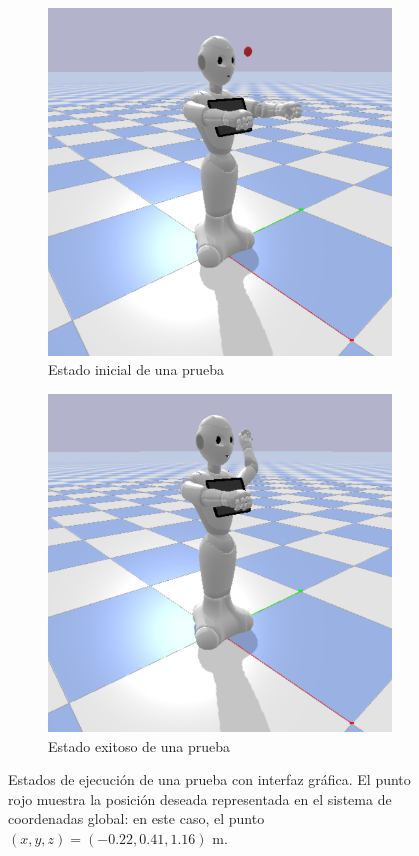 \begin{figure}[h!]
	\centering
	
	\begin{subfigure}[b]{0.45\textwidth}
		\centering
		\includegraphics[width=\textwidth]{images/metodologia/test_start}
		\caption{Estado inicial de una prueba}
		\label{fig:test-start}
	\end{subfigure}
	\hfill
	\begin{subfigure}[b]{0.465\textwidth}
		\centering
		\includegraphics[width=\textwidth]{images/metodologia/test_reached}
		\caption{Estado exitoso de una prueba}
		\label{fig:test-reached}
	\end{subfigure}
	
	\caption{Estados de ejecución de una prueba con interfaz gráfica. El punto rojo muestra la posición deseada representada en el sistema de coordenadas global: en este caso, el punto $(x,y,z)=(-0.22, 0.41, 1.16) \text{ m}$.}
	\label{fig:test-gui}
\end{figure}